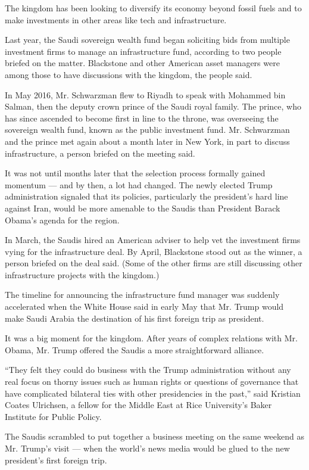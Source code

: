 The kingdom has been looking to diversify its economy beyond fossil
fuels and to make investments in other areas like tech and
infrastructure.

Last year, the Saudi sovereign wealth fund began soliciting bids from
multiple investment firms to manage an infrastructure fund, according to
two people briefed on the matter. Blackstone and other American asset
managers were among those to have discussions with the kingdom, the
people said.

In May 2016, Mr. Schwarzman flew to Riyadh to speak with Mohammed bin
Salman, then the deputy crown prince of the Saudi royal family. The
prince, who has since ascended to become first in line to the throne,
was overseeing the sovereign wealth fund, known as the public investment
fund. Mr. Schwarzman and the prince met again about a month later in New
York, in part to discuss infrastructure, a person briefed on the meeting
said.

It was not until months later that the selection process formally gained
momentum --- and by then, a lot had changed. The newly elected Trump
administration signaled that its policies, particularly the president's
hard line against Iran, would be more amenable to the Saudis than
President Barack Obama's agenda for the region.

In March, the Saudis hired an American adviser to help vet the
investment firms vying for the infrastructure deal. By April, Blackstone
stood out as the winner, a person briefed on the deal said. (Some of the
other firms are still discussing other infrastructure projects with the
kingdom.)

The timeline for announcing the infrastructure fund manager was suddenly
accelerated when the White House said in early May that Mr. Trump would
make Saudi Arabia the destination of his first foreign trip as
president.

It was a big moment for the kingdom. After years of complex relations
with Mr. Obama, Mr. Trump offered the Saudis a more straightforward
alliance.

``They felt they could do business with the Trump administration without
any real focus on thorny issues such as human rights or questions of
governance that have complicated bilateral ties with other presidencies
in the past,'' said Kristian Coates Ulrichsen, a fellow for the Middle
East at Rice University's Baker Institute for Public Policy.

The Saudis scrambled to put together a business meeting on the same
weekend as Mr. Trump's visit --- when the world's news media would be
glued to the new president's first foreign trip.

